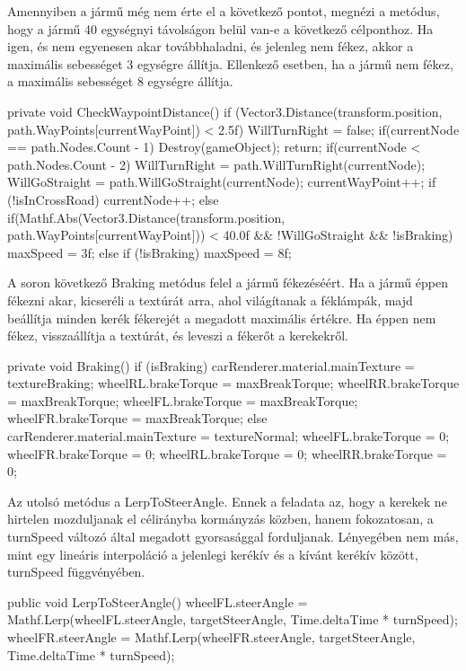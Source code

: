 Amennyiben a jármű még nem érte el a következő pontot, megnézi a metódus, hogy a jármű 40 egységnyi távolságon belül van-e a következő célponthoz. Ha igen, és nem egyenesen akar továbbhaladni, és jelenleg nem fékez, akkor a maximális sebességet 3 egységre állítja.
Ellenkező esetben, ha a jármű nem fékez, a maximális sebességet 8 egységre állítja.
\begin{cpp}
private void CheckWaypointDistance()
    {
        if (Vector3.Distance(transform.position,
        path.WayPoints[currentWayPoint]) < 2.5f)
        {
            WillTurnRight = false;
            if(currentNode == path.Nodes.Count - 1)
            {
                Destroy(gameObject);
                return;
            }
            if(currentNode < path.Nodes.Count - 2)
            {
                WillTurnRight = path.WillTurnRight(currentNode);
                WillGoStraight = path.WillGoStraight(currentNode);
            }
            currentWayPoint++;
            if (!isInCrossRoad)
            {
                currentNode++;
            }
        }else if(Mathf.Abs(Vector3.Distance(transform.position, 
        path.WayPoints[currentWayPoint])) < 40.0f && !WillGoStraight && 
        !isBraking)
        {
            maxSpeed = 3f;
        }
        else if (!isBraking)
        {
            maxSpeed = 8f;
        }
    }
\end{cpp}

A soron következő Braking metódus felel a jármű fékezéséért. Ha a jármű éppen fékezni akar, kicseréli a textúrát arra, ahol világítanak a féklámpák, majd beállítja minden kerék fékerejét a megadott maximális értékre.
Ha éppen nem fékez, visszaállítja a textúrát, és leveszi a fékerőt a kerekekről.
\begin{cpp}
private void Braking()
    {
        if (isBraking)
        {
            carRenderer.material.mainTexture = textureBraking;
            wheelRL.brakeTorque = maxBreakTorque;
            wheelRR.brakeTorque = maxBreakTorque;
            wheelFL.brakeTorque = maxBreakTorque;
            wheelFR.brakeTorque = maxBreakTorque;
        }
        else
        {
            carRenderer.material.mainTexture = textureNormal;
            wheelFL.brakeTorque = 0;
            wheelFR.brakeTorque = 0;
            wheelRL.brakeTorque = 0;
            wheelRR.brakeTorque = 0;
        }
    }
\end{cpp}

Az utolsó metódus a LerpToSteerAngle. Ennek a feladata az, hogy a kerekek ne hirtelen mozduljanak el célirányba kormányzás közben, hanem fokozatosan, a turnSpeed változó által megadott gyorsasággal forduljanak. Lényegében nem más, mint egy lineáris interpoláció a jelenlegi kerékív és a kívánt kerékív között, turnSpeed függvényében.
\begin{cpp}
public void LerpToSteerAngle()
    {
        wheelFL.steerAngle = Mathf.Lerp(wheelFL.steerAngle, 
        targetSteerAngle, Time.deltaTime * turnSpeed);
        wheelFR.steerAngle = Mathf.Lerp(wheelFR.steerAngle, 
        targetSteerAngle, Time.deltaTime * turnSpeed);
    }
\end{cpp}

